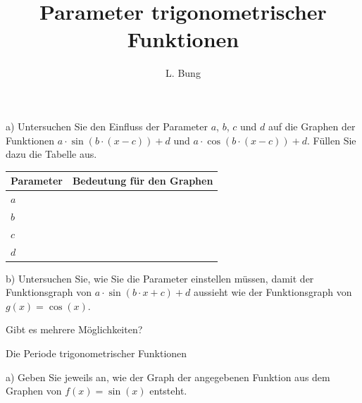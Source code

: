 \documentclass[11pt, a4paper, oneside]{article}
\begin{document}
	\author{L. Bung}
	\title{Parameter trigonometrischer Funktionen}
	\subject{Mathematik}
	\maketitle
	
	
	\begin{minipage}{.75\textwidth}
		a) Untersuchen Sie den Einfluss der Parameter $a$, $b$, $c$ und $d$ auf die Graphen der Funktionen $a \cdot \sin(b \cdot (x-c))+d$ und $a \cdot \cos(b \cdot (x-c))+d$.
		Füllen Sie dazu die Tabelle aus.
	\end{minipage}
	\begin{minipage}{.25\textwidth}
	\end{minipage}
	
	\begin{table}[h!]
		\centering
		\begin{tabularx}{\textwidth}{|l|X|}
			\hline
			\textbf{Parameter} & \textbf{Bedeutung für den Graphen}\\
			\hline
			\hline
			$a$ & \phantom{x}\vspace{1.5cm}\\
			\hline
			$b$ & \phantom{x}\vspace{1.5cm}\\
			\hline
			$c$ & \phantom{x}\vspace{1.5cm}\\
			\hline
			$d$ & \phantom{x}\vspace{1.5cm}\\
			\hline
		\end{tabularx}
	\end{table}
	
	b) Untersuchen Sie, wie Sie die Parameter einstellen müssen, damit der Funktionsgraph von ${a \cdot \sin(b \cdot x + c) + d}$ aussieht wie der Funktionsgraph von $g(x) = \cos(x)$.
	
	Gibt es mehrere Möglichkeiten?
	
	\lines[3cm]
	
	\begin{hint}{Die Periode trigonometrischer Funktionen}
		\phantom{x}\vspace{5cm}
	\end{hint}
	
	
	a) Geben Sie jeweils an, wie der Graph der angegebenen Funktion aus dem Graphen von $f(x) = \sin(x)$ entsteht.
	
\end{document}
